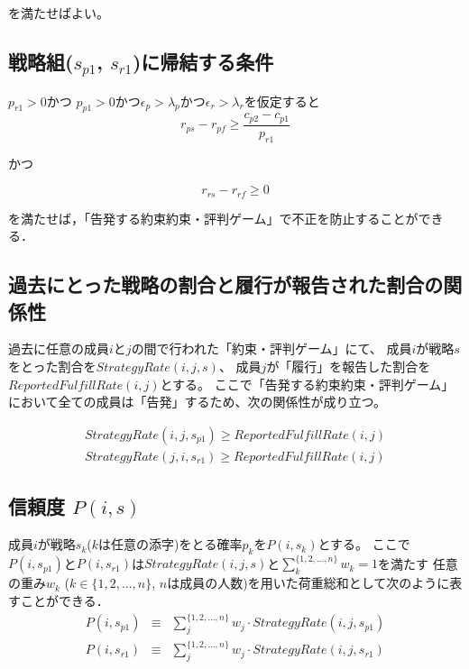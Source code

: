 を満たせばよい。


\subsection{戦略組($s_{p1}$, $s_{r1}$)に帰結する条件}

$p_{r1} > 0$かつ $p_{p1} > 0$かつ$ \epsilon_p > \lambda_p $かつ$ \epsilon_r > \lambda_r $を仮定すると\\

\begin{equation}
  r_{ps} - r_{pf} \geq \frac{c_{p2} - c_{p1}}{p_{r1} } \label{conditionByPr1}
\end{equation}

かつ

\begin{equation}
  r_{rs} - r_{rf} \geq 0
\end{equation}

を満たせば，「告発する約束約束・評判ゲーム」で不正を防止することができる．


\subsection{過去にとった戦略の割合と履行が報告された割合の関係性}
過去に任意の成員$i$と$j$の間で行われた「約束・評判ゲーム」にて、
成員$i$が戦略$s$をとった割合を$StrategyRate(i, j, s)$、
成員$j$が「履行」を報告した割合を$ReportedFulfillRate(i, j)$とする。
ここで「告発する約束約束・評判ゲーム」において全ての成員は「告発」するため、次の関係性が成り立つ。

\begin{eqnarray}
  StrategyRate(i, j, s_{p1}) \geq ReportedFulfillRate(i, j) \label{inequalityFR} \\
  StrategyRate(j, i, s_{r1}) \geq ReportedFulfillRate(i, j)
\end{eqnarray}


\subsection{信頼度 $ P(i, s) $}

成員$i$が戦略$s_k$($k$は任意の添字)をとる確率$p_k$を$P(i, s_k)$とする。
ここで$P(i, s_{p1})$と$P(i, s_{r1})$は$StrategyRate(i, j, s)$と$\sum^{\{1, 2, ..., n\}}_{k}w_k = 1$を満たす
任意の重み$ w_k $ ($k \in \{1, 2, ..., n\}$, $n$は成員の人数)を用いた荷重総和として次のように表すことができる． \\

\begin{eqnarray}
  P(i, s_{p1}) &\equiv& \sum^{\{1,2,..., n\}}_{j} w_{j} \cdot StrategyRate(i, j, s_{p1}) \\
  P(i, s_{r1}) &\equiv& \sum^{\{1,2,..., n\}}_{j} w_{j} \cdot StrategyRate(i, j, s_{r1})
\end{eqnarray}


